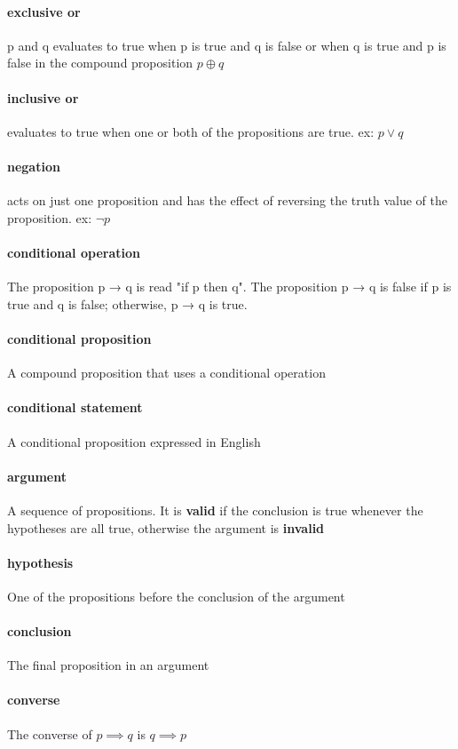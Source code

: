 \documentclass[a4paper]{article}
\begin{document}
\paragraph{exclusive or} p and q evaluates to true when p is true and q is false or when q is true and p is false in the compound proposition $p \oplus q$
\paragraph{inclusive or} evaluates to true when one or both of the propositions are true. ex: $p \lor q$
\paragraph{negation} acts on just one proposition and has the effect of reversing the truth value of the proposition. ex: $\lnot p$
\paragraph{conditional operation} The proposition p → q is read "if p then q". The proposition p → q is false if p is true and q is false; otherwise, p → q is true. 
\paragraph{conditional proposition} A compound proposition that uses a conditional operation
\paragraph{conditional statement} A conditional proposition expressed in English
\paragraph{argument} A sequence of propositions. It is \textbf{valid} if the conclusion is true whenever the hypotheses are all true, otherwise the argument is \textbf{invalid}
\paragraph{hypothesis} One of the propositions before the conclusion of the argument
\paragraph{conclusion} The final proposition in an argument
\paragraph{converse} The converse of $p \implies q$ is $q \implies p$
\end{document}
